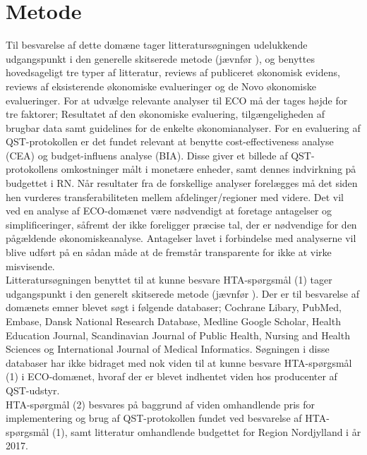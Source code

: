 \section{Metode}
Til besvarelse af dette domæne tager litteratursøgningen udelukkende udgangspunkt i den generelle skitserede metode (jævnfør ), og benyttes hovedsageligt tre typer af litteratur, reviews af publiceret økonomisk evidens, reviews af eksisterende økonomiske evalueringer og de Novo økonomiske evalueringer. For at udvælge relevante analyser til ECO må der tages højde for tre faktorer; Resultatet af den økonomiske evaluering, tilgængeligheden af brugbar data samt guidelines for de enkelte økonomianalyser. For en evaluering af QST-protokollen er det fundet relevant at benytte cost-effectiveness analyse (CEA) og budget-influens analyse (BIA). Disse giver et billede af QST-protokollens omkostninger målt i monetære enheder, samt dennes indvirkning på budgettet i RN. Når resultater fra de forskellige analyser forelægges må det siden hen vurderes transferabiliteten mellem afdelinger/regioner med videre. Det vil ved en analyse af ECO-domænet være nødvendigt at foretage antagelser og simplificeringer, såfremt der ikke foreligger præcise tal, der er nødvendige for den pågældende økonomiskeanalyse. Antagelser lavet i forbindelse med analyserne vil blive udført på en sådan måde at de fremstår transparente for ikke at virke misvisende. \\
Litteratursøgningen benyttet til at kunne besvare HTA-spørgsmål (1) tager udgangspunkt i den generelt skitserede metode (jævnfør ). Der er til besvarelse af domænets emner blevet søgt i følgende databaser; Cochrane Libary, PubMed, Embase, Dansk National Research Database, Medline Google Scholar, Health Education Journal, Scandinavian Journal of Public Health, Nursing and Health Sciences og International Journal of Medical Informatics. Søgningen i disse databaser har ikke bidraget med nok viden til at kunne besvare HTA-spørgsmål (1) i ECO-domænet, hvoraf der er blevet indhentet viden hos producenter af QST-udstyr. \\
HTA-spørgmål (2) besvares på baggrund af viden omhandlende pris for implementering og brug af QST-protokollen fundet ved  besvarelse af HTA-spørgsmål (1), samt litteratur omhandlende budgettet for Region Nordjylland i år 2017.  

